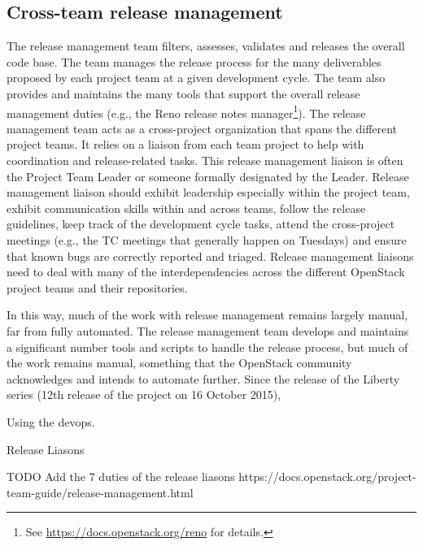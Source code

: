 \documentclass[dvipsnames]{interact}
\theoremstyle{plain}\newtheorem{theorem}{Theorem}[section]
\theoremstyle{definition}
\theoremstyle{remark}
\newenvironment{newStuff}{
    \begin{color}{Sepia}
    \begin{tabular}{|p{1.0\textwidth}|}
    \hline\\
    }
    { 
    \\\\\hline
    \end{tabular} 
    \end{color}
    }
\renewenvironment{newStuff}{}{}
\begin{document}
\begin{newStuff}
\begin{quotation}
\end{quotation}

 
 






\subsection{Cross-team release management } 

The release management team filters, assesses, validates and releases the overall code base. The team manages the release process for the many deliverables proposed by each project team at a given development cycle. The team also provides and maintains the many tools that support the overall release management duties (e.g., the Reno release notes manager\footnote{See \url{https://docs.openstack.org/reno} for details.}). The release management team acts as a cross-project organization that spans the different project teams. It relies on a liaison from each team project to help with coordination and release-related tasks. This release management liaison is often the Project Team Leader or someone formally designated by the Leader. Release management liaison should exhibit leadership especially within the project team, exhibit communication skills within and across teams, follow the release guidelines, keep track of the development cycle tasks, attend the cross-project meetings (e.g., the  \ac{TC} meetings that generally happen on Tuesdays) and ensure that known bugs are correctly reported and triaged. Release management liaisons need to deal with many of the interdependencies across the different OpenStack project teams and their repositories.

In this way, much of the work with release management remains largely manual, far from fully automated. The release management team develops and maintains a significant number tools and scripts to handle the release process, but much of the work remains manual, something that the OpenStack community acknowledges and intends to  automate further. Since the release of the Liberty series (12th release of the project on 16 October 2015),

Using the devops. 


Release Liasons 

TODO Add the 7 duties of the release liasons
https://docs.openstack.org/project-team-guide/release-management.html





\end{newStuff}
\end{document}
